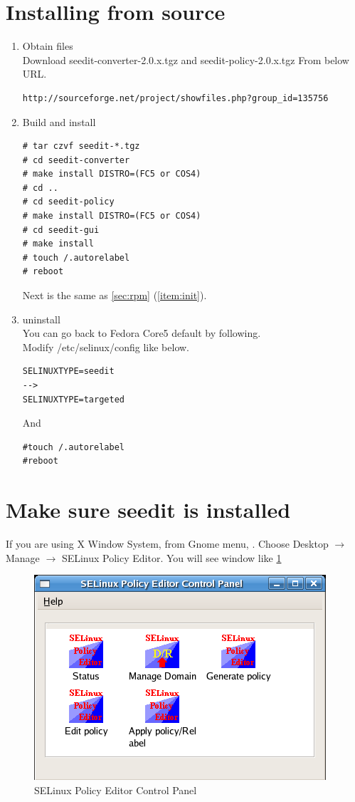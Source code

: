 \documentclass{article}
\begin{document}
\section{Installing from source}
\begin{enumerate}
 \item Obtain files\\
Download seedit-converter-2.0.x.tgz and seedit-policy-2.0.x.tgz
From below URL.
\begin{verbatim}
http://sourceforge.net/project/showfiles.php?group_id=135756	
\end{verbatim}
 \item Build and install\\
\begin{verbatim}
# tar czvf seedit-*.tgz
# cd seedit-converter
# make install DISTRO=(FC5 or COS4)
# cd .. 
# cd seedit-policy
# make install DISTRO=(FC5 or COS4)
# cd seedit-gui
# make install
# touch /.autorelabel
# reboot
\end{verbatim}
Next is the same as \ref{sec:rpm} (\ref{item:init}).\\
 \item uninstall\\
You can go back to Fedora Core5 default by following.\\
Modify /etc/selinux/config like below.
\begin{verbatim}
SELINUXTYPE=seedit
-->
SELINUXTYPE=targeted
\end{verbatim}
And 
\begin{verbatim}
#touch /.autorelabel
#reboot	
\end{verbatim}
\end{enumerate}

\section{Make sure seedit is installed}\label{sec:makesure}

If you are using X Window System,  from  Gnome menu, 
. Choose Desktop $\rightarrow$ Manage $\rightarrow$ SELinux
Policy Editor.
You will see window like \ref{fig:controlpanel}
\begin{figure}
\caption{SELinux Policy Editor Control Panel}\label{fig:controlpanel}
\includegraphics*{images/controlpanel.png}
\end{figure}
\end{document}
